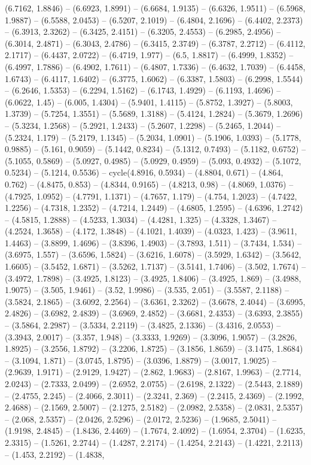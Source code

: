 (6.7162, 1.8846) -- (6.6923, 1.8991) -- (6.6684, 1.9135) -- (6.6326, 1.9511) -- (6.5968, 1.9887) -- (6.5588, 2.0453) -- (6.5207, 2.1019) -- (6.4804, 2.1696) -- (6.4402, 2.2373) -- (6.3913, 2.3262) -- (6.3425, 2.4151) -- (6.3205, 2.4553) -- (6.2985, 2.4956) -- (6.3014, 2.4871) -- (6.3043, 2.4786) -- (6.3415, 2.3749) -- (6.3787, 2.2712) -- (6.4112, 2.1717) -- (6.4437, 2.0722) -- (6.4719, 1.977) -- (6.5, 1.8817) -- (6.4999, 1.8352) -- (6.4997, 1.7886) -- (6.4902, 1.7611) -- (6.4807, 1.7336) -- (6.4632, 1.7039) -- (6.4458, 1.6743) -- (6.4117, 1.6402) -- (6.3775, 1.6062) -- (6.3387, 1.5803) -- (6.2998, 1.5544) -- (6.2646, 1.5353) -- (6.2294, 1.5162) -- (6.1743, 1.4929) -- (6.1193, 1.4696) -- (6.0622, 1.45) -- (6.005, 1.4304) -- (5.9401, 1.4115) -- (5.8752, 1.3927) -- (5.8003, 1.3739) -- (5.7254, 1.3551) -- (5.5689, 1.3188) -- (5.4124, 1.2824) -- (5.3679, 1.2696) -- (5.3234, 1.2568) -- (5.2921, 1.2433) -- (5.2607, 1.2298) -- (5.2465, 1.2044) -- (5.2324, 1.179) -- (5.2179, 1.1345) -- (5.2034, 1.0901) -- (5.1906, 1.0393) -- (5.1778, 0.9885) -- (5.161, 0.9059) -- (5.1442, 0.8234) -- (5.1312, 0.7493) -- (5.1182, 0.6752) -- (5.1055, 0.5869) -- (5.0927, 0.4985) -- (5.0929, 0.4959) -- (5.093, 0.4932) -- (5.1072, 0.5234) -- (5.1214, 0.5536) -- cycle(4.8916, 0.5934) -- (4.8804, 0.671) -- (4.864, 0.762) -- (4.8475, 0.853) -- (4.8344, 0.9165) -- (4.8213, 0.98) -- (4.8069, 1.0376) -- (4.7925, 1.0952) -- (4.7791, 1.1371) -- (4.7657, 1.179) -- (4.754, 1.2023) -- (4.7422, 1.2256) -- (4.7318, 1.2352) -- (4.7214, 1.2449) -- (4.6805, 1.2595) -- (4.6396, 1.2742) -- (4.5815, 1.2888) -- (4.5233, 1.3034) -- (4.4281, 1.325) -- (4.3328, 1.3467) -- (4.2524, 1.3658) -- (4.172, 1.3848) -- (4.1021, 1.4039) -- (4.0323, 1.423) -- (3.9611, 1.4463) -- (3.8899, 1.4696) -- (3.8396, 1.4903) -- (3.7893, 1.511) -- (3.7434, 1.534) -- (3.6975, 1.557) -- (3.6596, 1.5824) -- (3.6216, 1.6078) -- (3.5929, 1.6342) -- (3.5642, 1.6605) -- (3.5452, 1.6871) -- (3.5262, 1.7137) -- (3.5141, 1.7406) -- (3.502, 1.7674) -- (3.4972, 1.7898) -- (3.4925, 1.8123) -- (3.4925, 1.8406) -- (3.4925, 1.869) -- (3.4988, 1.9075) -- (3.505, 1.9461) -- (3.52, 1.9986) -- (3.535, 2.051) -- (3.5587, 2.1188) -- (3.5824, 2.1865) -- (3.6092, 2.2564) -- (3.6361, 2.3262) -- (3.6678, 2.4044) -- (3.6995, 2.4826) -- (3.6982, 2.4839) -- (3.6969, 2.4852) -- (3.6681, 2.4353) -- (3.6393, 2.3855) -- (3.5864, 2.2987) -- (3.5334, 2.2119) -- (3.4825, 2.1336) -- (3.4316, 2.0553) -- (3.3943, 2.0017) -- (3.357, 1.948) -- (3.3333, 1.9269) -- (3.3096, 1.9057) -- (3.2826, 1.8925) -- (3.2556, 1.8792) -- (3.2206, 1.8725) -- (3.1856, 1.8659) -- (3.1475, 1.8684) -- (3.1094, 1.871) -- (3.0745, 1.8795) -- (3.0396, 1.8879) -- (3.0017, 1.9025) -- (2.9639, 1.9171) -- (2.9129, 1.9427) -- (2.862, 1.9683) -- (2.8167, 1.9963) -- (2.7714, 2.0243) -- (2.7333, 2.0499) -- (2.6952, 2.0755) -- (2.6198, 2.1322) -- (2.5443, 2.1889) -- (2.4755, 2.245) -- (2.4066, 2.3011) -- (2.3241, 2.369) -- (2.2415, 2.4369) -- (2.1992, 2.4688) -- (2.1569, 2.5007) -- (2.1275, 2.5182) -- (2.0982, 2.5358) -- (2.0831, 2.5357) -- (2.068, 2.5357) -- (2.0426, 2.5296) -- (2.0172, 2.5236) -- (1.9685, 2.5041) -- (1.9198, 2.4845) -- (1.8436, 2.4469) -- (1.7674, 2.4092) -- (1.6954, 2.3704) -- (1.6235, 2.3315) -- (1.5261, 2.2744) -- (1.4287, 2.2174) -- (1.4254, 2.2143) -- (1.4221, 2.2113) -- (1.453, 2.2192) -- (1.4838, 